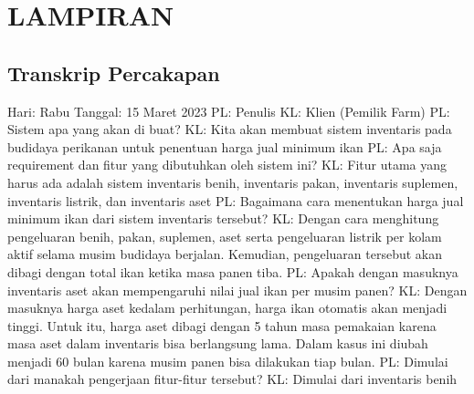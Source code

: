 \appendix
\chapter{LAMPIRAN}
\section {Transkrip Percakapan}
\begin{flushleft}
Hari: Rabu
\linebreak
Tanggal: 15 Maret 2023
\linebreak
PL: Penulis
\linebreak
KL: Klien (Pemilik Farm)
\linebreak
\linebreak
PL: Sistem apa yang akan di buat?
\linebreak
KL: Kita akan membuat sistem inventaris pada budidaya perikanan untuk penentuan harga jual minimum ikan
\linebreak
PL: Apa saja requirement dan fitur yang dibutuhkan oleh sistem ini?
\linebreak
KL: Fitur utama yang harus ada adalah sistem inventaris benih, inventaris pakan, inventaris suplemen, inventaris listrik, dan inventaris aset
\linebreak
PL: Bagaimana cara menentukan harga jual minimum ikan dari sistem inventaris tersebut?
\linebreak
KL: Dengan cara menghitung pengeluaran benih, pakan, suplemen, aset serta pengeluaran listrik per kolam aktif selama musim budidaya berjalan. Kemudian, pengeluaran tersebut akan dibagi dengan total ikan ketika masa panen tiba.
\linebreak
PL: Apakah dengan masuknya inventaris aset akan mempengaruhi nilai jual ikan per musim panen?
\linebreak
KL: Dengan masuknya harga aset kedalam perhitungan, harga ikan otomatis akan menjadi tinggi. Untuk itu, harga aset dibagi dengan 5 tahun masa pemakaian karena masa aset dalam inventaris bisa berlangsung lama. Dalam kasus ini diubah menjadi 60 bulan karena musim panen bisa dilakukan tiap bulan.
\linebreak
PL: Dimulai dari manakah pengerjaan fitur-fitur tersebut?
\linebreak
KL: Dimulai dari inventaris benih
\end{flushleft}